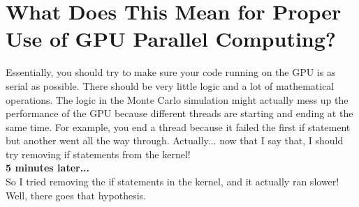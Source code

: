 \documentclass[12pt,letterpaper]{article}
\begin{document}
\section{What Does This Mean for Proper Use of GPU Parallel Computing?}

Essentially, you should try to make sure your code running on the GPU is as serial as possible. There should be very little logic and a lot of mathematical operations. The logic in the Monte Carlo simulation might actually mess up the performance of the GPU because different threads are starting and ending at the same time. For example, you end a thread because it failed the first if statement but another went all the way through. Actually... now that I say that, I should try removing if statements from the kernel! \\

\noindent \textbf{5 minutes later...} \\

\noindent So I tried removing the if statements in the kernel, and it actually ran slower! Well, there goes that hypothesis. 
\end{document}
